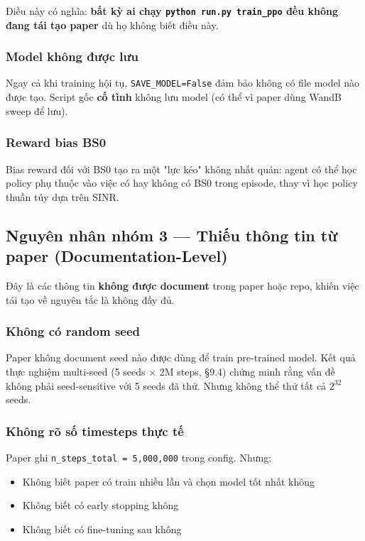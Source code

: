 \documentclass[11pt]{article}
\begin{document}
Điều này có nghĩa: \textbf{bất kỳ ai chạy \texttt{python run.py train\_ppo} đều không đang tái tạo paper} dù họ không biết điều này.

\subsubsection{Model không được lưu}

Ngay cả khi training hội tụ, \texttt{SAVE\_MODEL=False} đảm bảo không có file model nào được tạo. Script gốc \textbf{cố tình} không lưu model (có thể vì paper dùng WandB sweep để lưu).

\subsubsection{Reward bias BS0}

Bias reward đối với BS0 tạo ra một "lực kéo" không nhất quán: agent có thể học policy phụ thuộc vào việc có hay không có BS0 trong episode, thay vì học policy thuần túy dựa trên SINR.

\subsection{Nguyên nhân nhóm 3 --- Thiếu thông tin từ paper (Documentation-Level)}

Đây là các thông tin \textbf{không được document} trong paper hoặc repo, khiến việc tái tạo về nguyên tắc là không đầy đủ.

\subsubsection{Không có random seed}

Paper không document seed nào được dùng để train pre-trained model. Kết quả thực nghiệm multi-seed (5 seeds $\times$ 2M steps, \S9.4) chứng minh rằng vấn đề không phải seed-sensitive với 5 seeds đã thử. Nhưng không thể thử tất cả $2^{32}$ seeds.

\subsubsection{Không rõ số timesteps thực tế}

Paper ghi \texttt{n\_steps\_total = 5,000,000} trong config. Nhưng:
\begin{itemize}
  \item Không biết paper có train nhiều lần và chọn model tốt nhất không
  \item Không biết có early stopping không
  \item Không biết có fine-tuning sau không
\end{itemize}
\end{document}
